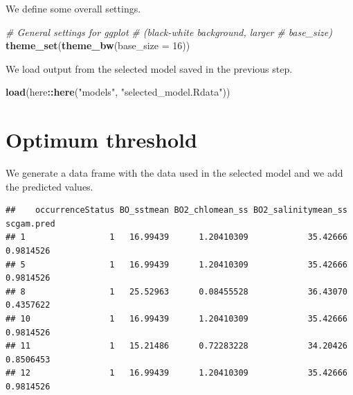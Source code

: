 \documentclass[
]{book}
\newenvironment{Shaded}{\begin{snugshade}}{\end{snugshade}}
\newcommand{\AttributeTok}[1]{\textcolor[rgb]{0.13,0.29,0.53}{#1}}
\newcommand{\CommentTok}[1]{\textcolor[rgb]{0.56,0.35,0.01}{\textit{#1}}}
\newcommand{\DecValTok}[1]{\textcolor[rgb]{0.00,0.00,0.81}{#1}}
\newcommand{\FunctionTok}[1]{\textcolor[rgb]{0.13,0.29,0.53}{\textbf{#1}}}
\newcommand{\NormalTok}[1]{#1}
\newcommand{\OtherTok}[1]{\textcolor[rgb]{0.56,0.35,0.01}{#1}}
\newcommand{\SpecialCharTok}[1]{\textcolor[rgb]{0.81,0.36,0.00}{\textbf{#1}}}
\newcommand{\StringTok}[1]{\textcolor[rgb]{0.31,0.60,0.02}{#1}}
\begin{document}
We define some overall settings.

\begin{Shaded}
\begin{Highlighting}[]
\CommentTok{\# General settings for ggplot}
\CommentTok{\# (black{-}white background, larger}
\CommentTok{\# base\_size)}
\FunctionTok{theme\_set}\NormalTok{(}\FunctionTok{theme\_bw}\NormalTok{(}\AttributeTok{base\_size =} \DecValTok{16}\NormalTok{))}
\end{Highlighting}
\end{Shaded}

We load output from the selected model saved in the previous step.

\begin{Shaded}
\begin{Highlighting}[]
\FunctionTok{load}\NormalTok{(here}\SpecialCharTok{::}\FunctionTok{here}\NormalTok{(}\StringTok{"models"}\NormalTok{, }\StringTok{"selected\_model.Rdata"}\NormalTok{))}
\end{Highlighting}
\end{Shaded}

\section{Optimum threshold}\label{optimum-threshold}

We generate a data frame with the data used in the selected model and we add the predicted values.

\begin{Shaded}
\end{Shaded}

\begin{verbatim}
##    occurrenceStatus BO_sstmean BO2_chlomean_ss BO2_salinitymean_ss scgam.pred
## 1                 1   16.99439      1.20410309            35.42666  0.9814526
## 5                 1   16.99439      1.20410309            35.42666  0.9814526
## 8                 1   25.52963      0.08455528            36.43070  0.4357622
## 10                1   16.99439      1.20410309            35.42666  0.9814526
## 11                1   15.21486      0.72283228            34.20426  0.8506453
## 12                1   16.99439      1.20410309            35.42666  0.9814526
\end{verbatim}
\end{document}
